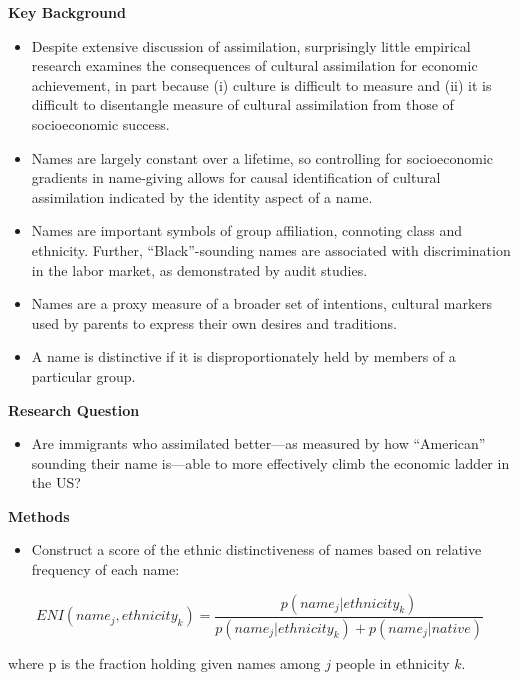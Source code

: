 \documentclass[
]{book}
\providecommand{\tightlist}{%
  \setlength{\itemsep}{0pt}\setlength{\parskip}{0pt}}
\begin{document}
\textbf{Key Background}

\begin{itemize}
\tightlist
\item
  Despite extensive discussion of assimilation, surprisingly little empirical research examines the consequences of cultural assimilation for economic achievement, in part because (i) culture is difficult to measure and (ii) it is difficult to disentangle measure of cultural assimilation from those of socioeconomic success.
\item
  Names are largely constant over a lifetime, so controlling for socioeconomic gradients in name-giving allows for causal identification of cultural assimilation indicated by the identity aspect of a name.
\item
  Names are important symbols of group affiliation, connoting class and ethnicity. Further, ``Black''-sounding names are associated with discrimination in the labor market, as demonstrated by audit studies.
\item
  Names are a proxy measure of a broader set of intentions, cultural markers used by parents to express their own desires and traditions.
\item
  A name is distinctive if it is disproportionately held by members of a particular group.
\end{itemize}

\textbf{Research Question}

\begin{itemize}
\tightlist
\item
  Are immigrants who assimilated better---as measured by how ``American'' sounding their name is---able to more effectively climb the economic ladder in the US?
\end{itemize}

\textbf{Methods}

\begin{itemize}
\tightlist
\item
  Construct a score of the ethnic distinctiveness of names based on relative frequency of each name:
\end{itemize}

\begin{equation}
ENI(name_j, ethnicity_k) = \frac{p (name_j | ethnicity_k)}{p(name_j | ethnicity_k) + p(name_j | native)}
\end{equation}

where p is the fraction holding given names among \(j\) people in ethnicity \(k\).
\end{document}

